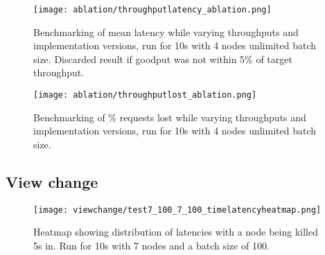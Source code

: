 \begin{figure}[h!]
\centering
\texttt{[image: ablation/throughputlatency\_ablation.png]}
\caption{Benchmarking of mean latency while varying throughputs and implementation versions, run for 10s with 4 nodes unlimited batch size. Discarded result if goodput was not within 5\% of target throughput.}
\end{figure}

\begin{figure}[h!]
\centering
\texttt{[image: ablation/throughputlost\_ablation.png]}
\caption{Benchmarking of \% requests lost while varying throughputs and implementation versions, run for 10s with 4 nodes unlimited batch size.}
\end{figure}

\subsection{View change}
\begin{figure}[h!]
\centering
\texttt{[image: viewchange/test7\_100\_7\_100\_timelatencyheatmap.png]}
\caption{Heatmap showing distribution of latencies with a node being killed 5s in. Run for 10s with 7 nodes and a batch size of 100.}
\end{figure}








